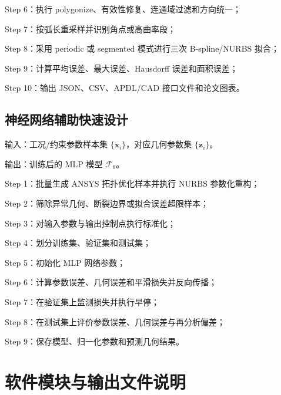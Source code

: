 \documentclass{FRB-style}
\begin{document}
\noindent Step 6：执行 polygonize、有效性修复、连通域过滤和方向统一；

\noindent Step 7：按弧长重采样并识别角点或高曲率段；

\noindent Step 8：采用 periodic 或 segmented 模式进行三次 B-spline/NURBS 拟合；

\noindent Step 9：计算平均误差、最大误差、Hausdorff 误差和面积误差；

\noindent Step 10：输出 JSON、CSV、APDL/CAD 接口文件和论文图表。

\subsection{神经网络辅助快速设计}

输入：工况/约束参数样本集 $\{\mathbf{x}_i\}$，对应几何参数集 $\{\mathbf{z}_i\}$。

输出：训练后的 MLP 模型 $\mathcal{F}_{\theta}$。

\noindent Step 1：批量生成 ANSYS 拓扑优化样本并执行 NURBS 参数化重构；

\noindent Step 2：筛除异常几何、断裂边界或拟合误差超限样本；

\noindent Step 3：对输入参数与输出控制点执行标准化；

\noindent Step 4：划分训练集、验证集和测试集；

\noindent Step 5：初始化 MLP 网络参数；

\noindent Step 6：计算参数误差、几何误差和平滑损失并反向传播；

\noindent Step 7：在验证集上监测损失并执行早停；

\noindent Step 8：在测试集上评价参数误差、几何误差与再分析偏差；

\noindent Step 9：保存模型、归一化参数和预测几何结果。

\section{软件模块与输出文件说明}
\end{document}
